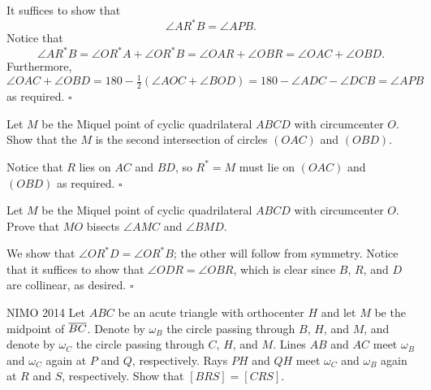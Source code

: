 \documentclass{article}
\begin{document}
It suffices to show that \[\angle AR^*B = \angle APB.\] Notice that \[\angle AR^*B = \angle OR^*A + \angle OR^*B = \angle OAR + \angle OBR =  \angle OAC + \angle OBD.\] Furthermore, \[\angle OAC + \angle OBD = 180 - \tfrac{1}{2}\left(\angle AOC + \angle BOD\right) = 180 - \angle ADC - \angle DCB = \angle APB\] as required. $\square$

\begin{problem}[10.14]{}
Let $M$ be the Miquel point of cyclic quadrilateral $ABCD$ with circumcenter $O$. Show that the $M$ is the second intersection of circles $(OAC)$ and $(OBD)$.
\end{problem}

Notice that $R$ lies on $AC$ and $BD$, so $R^* = M$ must lie on $(OAC)$ and $(OBD)$ as required. $\square$

\begin{problem}[10.15]{}
Let $M$ be the Miquel point of cyclic quadrilateral $ABCD$ with circumcenter $O$. Prove that $MO$ bisects $\angle AMC$ and $\angle BMD$.
\end{problem}

We show that $\angle OR^*D = \angle OR^*B$; the other will follow from symmetry. Notice that it suffices to show that $\angle ODR = \angle OBR$, which is clear since $B$, $R$, and $D$ are collinear, as desired. $\square$

\begin{problem}[10.17]{NIMO 2014}
Let $ABC$ be an acute triangle with orthocenter $H$ and let $M$ be the midpoint of $\overline{BC}$. Denote by $\omega_B$ the circle passing through $B$, $H$, and $M$, and denote by $\omega_C$ the circle passing through $C$, $H$, and $M$. Lines $AB$ and $AC$ meet $\omega_B$ and $\omega_C$ again at $P$ and $Q$, respectively. Rays $PH$ and $QH$ meet $\omega_C$ and $\omega_B$ again at $R$ and $S$, respectively. Show that $[BRS] = [CRS]$.
\end{problem}
\end{document}
